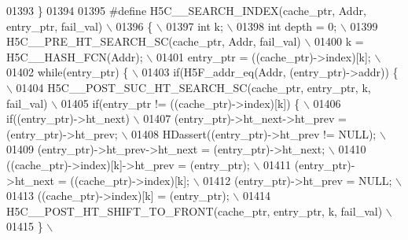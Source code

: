 \begin{DoxyCode}
01393 \textcolor{preprocessor}{\}}
01394 
01395 \textcolor{preprocessor}{#define H5C\_\_SEARCH\_INDEX(cache\_ptr, Addr, entry\_ptr, fail\_val)             \(\backslash\)}
01396 \textcolor{preprocessor}{\{                                                                           \(\backslash\)}
01397 \textcolor{preprocessor}{    int k;                                                                  \(\backslash\)}
01398 \textcolor{preprocessor}{    int depth = 0;                                                          \(\backslash\)}
01399 \textcolor{preprocessor}{    H5C\_\_PRE\_HT\_SEARCH\_SC(cache\_ptr, Addr, fail\_val)                        \(\backslash\)}
01400 \textcolor{preprocessor}{    k = H5C\_\_HASH\_FCN(Addr);                                                \(\backslash\)}
01401 \textcolor{preprocessor}{    entry\_ptr = ((cache\_ptr)->index)[k];                                    \(\backslash\)}
01402 \textcolor{preprocessor}{    while(entry\_ptr) \{                                                      \(\backslash\)}
01403 \textcolor{preprocessor}{        if(H5F\_addr\_eq(Addr, (entry\_ptr)->addr)) \{                          \(\backslash\)}
01404 \textcolor{preprocessor}{            H5C\_\_POST\_SUC\_HT\_SEARCH\_SC(cache\_ptr, entry\_ptr, k, fail\_val)   \(\backslash\)}
01405 \textcolor{preprocessor}{            if(entry\_ptr != ((cache\_ptr)->index)[k]) \{                      \(\backslash\)}
01406 \textcolor{preprocessor}{                if((entry\_ptr)->ht\_next)                                    \(\backslash\)}
01407 \textcolor{preprocessor}{                    (entry\_ptr)->ht\_next->ht\_prev = (entry\_ptr)->ht\_prev;   \(\backslash\)}
01408 \textcolor{preprocessor}{                HDassert((entry\_ptr)->ht\_prev != NULL);                     \(\backslash\)}
01409 \textcolor{preprocessor}{                (entry\_ptr)->ht\_prev->ht\_next = (entry\_ptr)->ht\_next;       \(\backslash\)}
01410 \textcolor{preprocessor}{                ((cache\_ptr)->index)[k]->ht\_prev = (entry\_ptr);             \(\backslash\)}
01411 \textcolor{preprocessor}{                (entry\_ptr)->ht\_next = ((cache\_ptr)->index)[k];             \(\backslash\)}
01412 \textcolor{preprocessor}{                (entry\_ptr)->ht\_prev = NULL;                                \(\backslash\)}
01413 \textcolor{preprocessor}{                ((cache\_ptr)->index)[k] = (entry\_ptr);                      \(\backslash\)}
01414 \textcolor{preprocessor}{                H5C\_\_POST\_HT\_SHIFT\_TO\_FRONT(cache\_ptr, entry\_ptr, k, fail\_val) \(\backslash\)}
01415 \textcolor{preprocessor}{            \}                                                               \(\backslash\)}

\end{DoxyCode}
